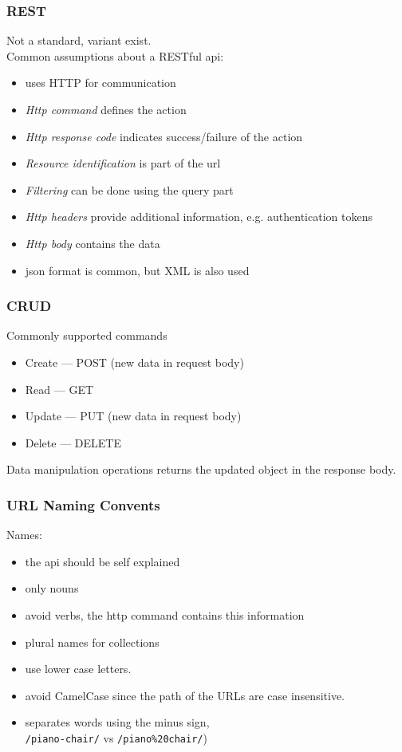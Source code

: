 \begin{frame}[fragile]
\frametitle{REST}
Not a standard, variant exist.
\vspace{3mm}
\\Common assumptions about a RESTful api:
\begin{itemize}
  \item uses HTTP for communication
  \item \emph{Http command} defines the action
  \item \emph{Http response code} indicates success/failure of the action
  \item \emph{Resource identification} is part of the url
  \item \emph{Filtering} can be done using the query part
  \item \emph{Http headers} provide additional information, e.g. authentication tokens
  \item \emph{Http body} contains the data
  \item {json format} is common, but XML is also used
\end{itemize}
\end{frame}


\begin{frame}[fragile]
\frametitle{CRUD}
Commonly supported commands
\begin{itemize}
  \item Create --- POST (new data in request body)
  \item Read --- GET
  \item Update --- PUT (new data in request body)
  \item Delete --- DELETE
\end{itemize}
\vspace{5mm}
Data manipulation operations returns the updated object in the response body.
\end{frame}

\begin{frame}[fragile]
\frametitle{URL Naming Convents}
\color{structure}
\noindent Names:
\begin{itemize}\color{structure}
  \item the api should be self explained
  \item only nouns
  \item avoid verbs, the http command contains this information
  \item plural names for collections
  \item use lower case letters.
  \item avoid CamelCase since the path of the URLs are case insensitive.
  \item separates words using the minus sign,\\  \texttt{/piano-chair/} vs \texttt{/piano\%20chair/})
\end{itemize}
\end{frame}

